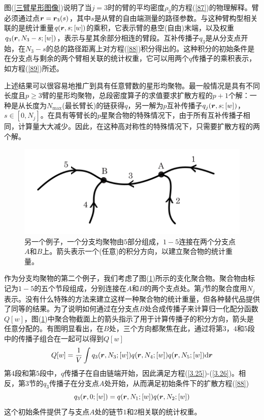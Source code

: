 图(\ref{三臂星形图像})说明了当$j=3$时的臂的平均密度$\rho _3$的方程(\ref{87})的物理解释。臂必须通过点$\bm{r}=\bm{r}_3(s)$，其中$s$是从臂的自由端测量的路径参数。与这种臂构型相关联的是统计重量$q(\bm{r},s;[w])$的乘积，它表示臂的悬空(自由)末端，以及权重$q_{3}(\bm{r},N_{3}-s;[w])$，表示与星其余部分相连的臂段。互补传播子$q_3$是从分支点开始，在$N_3-s$的总的路径距离上对方程(\ref{88})积分得出的。这种积分的初始条件是在分支点与剩余的两个臂相关联的统计权重，它可以用两个$q$传播子的乘积表示，如方程(\ref{89})所述。

上述结果可以很容易地推广到具有任意臂数的星形均聚物。最一般情况是具有不同长度且$p\geq3$臂的星形均聚物，总段密度算子的求值要求扩散方程的$p+1$个解：一种是从长度为$N_{\max}$(最长臂长)的链获得$q$，另一解为$p$互补传播子$q_j(\bm{r},s;[w])$，$s\in [0,N_j]$。在具有等臂长的$p$星聚合物的特殊情况下，由于所有互补传播子相同，计算量大大减少。因此，在这种高对称性的特殊情况下，只需要扩散方程的两个解。

\begin{figure}[H]
\centering
\includegraphics[scale=0.7]{./figures/36.png}
\caption{另一个例子，一个分支均聚物由$5$部分组成，$1-5$连接在两个分支点$A$和$B$上。箭头表示一个(任意)的积分方向，以建立聚合物的统计重量。}
\label{AB嵌段}
\end{figure}

作为分支均聚物的第二个例子，我们考虑了图(\ref{AB嵌段})所示的支化聚合物。聚合物由标记为$1-5$的五个节段组成，分别连接在$A$和$B$的两个支点处。第$j$节的聚合度用$N_j$表示。没有什么特殊的方法来建立这样一种聚合物的统计重量，但各种替代品提供了同等的结果。为了说明如何通过在分支点$B$处合成传播子来计算归一化配分函数$Q[w]$，图(\ref{AB嵌段})中聚合物截面上的箭头指示了用于计算传播子的积分方向，箭头是任意分配的。有图明显看出，在$B$处，三个方向都聚焦在此，通过将第$3$，$4$和$5$段中的传播子组合在一起可以得到$Q[w]$
\begin{equation}
Q[w]=\frac{1}{V}\int q_3(\bm{r},N_3;[w])q(\bm{r},N_4;[w])q(\bm{r},N_5;[w]) \mathrm{d}\bm{r}
\end{equation}
第$4$段和第$5$段中，$q$传播子在自由链端开始，因此满足方程(\ref{3.25})-(\ref{3.26})。相反，第3节的$q_3$传播子在分支点$A$处开始，从而满足初始条件下的扩散方程(\ref{88})
\begin{equation}
q_3(\bm{r},0;[w])=q(\bm{r},N_1;[w])q(\bm{r},N_2;[w])
\end{equation}
这个初始条件提供了与支点$A$处的链节$1$和$2$相关联的统计权重。

